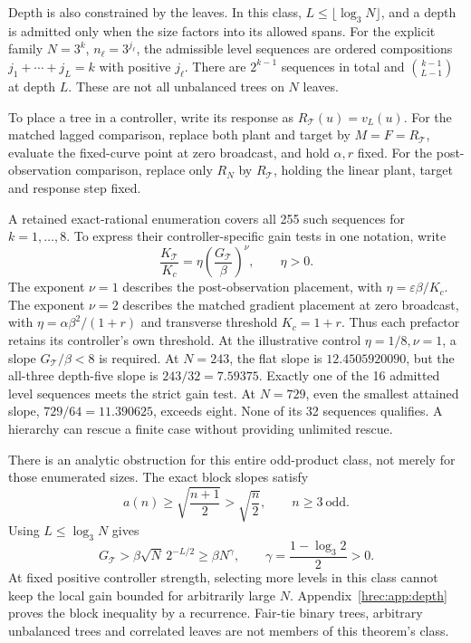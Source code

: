 Depth is also constrained by the leaves. In this class, \(L\le\lfloor\log_3N\rfloor\), and a depth is admitted only when the size factors into its allowed spans. For the explicit family \(N=3^k\), \(n_\ell=3^{j_\ell}\), the admissible level sequences are ordered compositions \(j_1+\cdots+j_L=k\) with positive \(j_\ell\). There are \(2^{k-1}\) sequences in total and \(\binom{k-1}{L-1}\) at depth \(L\). These are not all unbalanced trees on \(N\) leaves.

To place a tree in a controller, write its response as \(R_{\mathcal T}(u)=v_L(u)\). For the matched lagged comparison, replace both plant and target by \(M=F=R_{\mathcal T}\), evaluate the fixed-curve point at zero broadcast, and hold \(\alpha,r\) fixed. For the post-observation comparison, replace only \(R_N\) by \(R_{\mathcal T}\), holding the linear plant, target and response step fixed.

A retained exact-rational enumeration covers all 255 such sequences for \(k=1,\ldots,8\). To express their controller-specific gain tests in one notation, write
\begin{equation}
 \frac{K_{\mathcal T}}{K_c}
   =\eta\left(\frac{G_{\mathcal T}}{\beta}\right)^\nu,
 \qquad \eta>0.
 \label{hrec:eq:normalised-gain}
\end{equation}
The exponent \(\nu=1\) describes the post-observation placement, with \(\eta=\varepsilon\beta/K_c\). The exponent \(\nu=2\) describes the matched gradient placement at zero broadcast, with \(\eta=\alpha\beta^2/(1+r)\) and transverse threshold \(K_c=1+r\). Thus each prefactor retains its controller's own threshold. At the illustrative control \(\eta=1/8,\nu=1\), a slope \(G_{\mathcal T}/\beta<8\) is required. At \(N=243\), the flat slope is \(12.4505920090\), but the all-three depth-five slope is \(243/32=7.59375\). Exactly one of the 16 admitted level sequences meets the strict gain test. At \(N=729\), even the smallest attained slope, \(729/64=11.390625\), exceeds eight. None of its 32 sequences qualifies. A hierarchy can rescue a finite case without providing unlimited rescue.

There is an analytic obstruction for this entire odd-product class, not merely for those enumerated sizes. The exact block slopes satisfy
\begin{equation}
 a(n)\ge\sqrt{\frac{n+1}{2}}>\sqrt{\frac n2},
 \qquad n\ge3\ \text{odd}.
 \label{hrec:eq:block-bound}
\end{equation}
Using \(L\le\log_3N\) gives
\begin{equation}
 G_{\mathcal T}>\beta\sqrt N\,2^{-L/2}
 \ge\beta N^\gamma,\qquad
 \gamma=\frac{1-\log_3 2}{2}>0.
 \label{hrec:eq:tree-bound}
\end{equation}
At fixed positive controller strength, selecting more levels in this class cannot keep the local gain bounded for arbitrarily large \(N\). Appendix~\ref{hrec:app:depth} proves the block inequality by a recurrence. Fair-tie binary trees, arbitrary unbalanced trees and correlated leaves are not members of this theorem's class.


